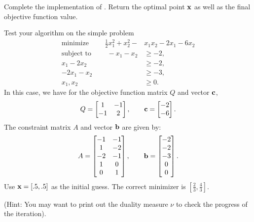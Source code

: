 \begin{problem}
Complete the implementation of .
Return the optimal point $\mathbf{x}$ as well as the final objective function value.

Test your algorithm on the simple problem
\begin{align*}
\text{minimize }\qquad \frac{1}{2}x_1^2 + x_2^2 - &x_1x_2 - 2x_1 - 6x_2\\
\text{subject to }\qquad
-x_1-x_2 &\geq -2,\\
x_1-2x_2 &\geq -2,\\
-2x_1-x_2&\geq -3,\\
x_1, x_2 &\geq 0.
\end{align*}
In this case, we have for the objective function matrix $Q$ and vector $\mathbf{c}$,
\[
Q = \begin{bmatrix}
1 & -1\\
-1 & 2
\end{bmatrix},
\qquad
\mathbf{c} = \begin{bmatrix}
-2\\
-6
\end{bmatrix}.
\]
The constraint matrix $A$ and vector $\mathbf{b}$ are given by:
\[
A = \begin{bmatrix}
-1 & -1\\
1 & -2\\
-2 & -1\\
1 & 0\\
0 & 1
\end{bmatrix},
\qquad
\mathbf{b} = \begin{bmatrix}
-2\\
-2\\
-3\\
0\\
0
\end{bmatrix}.
\]
Use $\mathbf{x} = [.5, .5]$ as the initial guess.
The correct minimizer is $\left[\frac{2}{3}, \frac{4}{3}\right].$

(Hint: You may want to print out the duality measure $\nu$ to check the progress of the iteration).
\end{problem}

